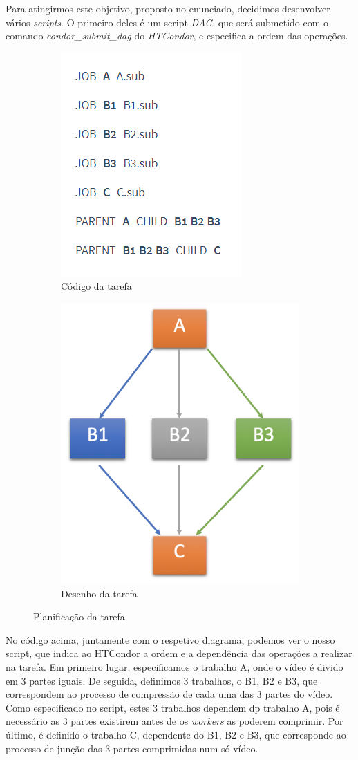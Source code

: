 \documentclass[a4paper]{report}
\begin{document}
    Para atingirmos este objetivo, proposto no enunciado, decidimos desenvolver vários \textit{scripts}. O primeiro deles é um script \textit{DAG}, que será submetido com o comando \textit{condor\_submit\_dag} do \textit{HTCondor}, e especifica a ordem das operações.

	\begin{figure}[h]
		\centering
		\begin{subfigure}{.5\textwidth}
			\centering
			\includegraphics[width=.4\linewidth]{DAG.png}
			\caption{Código da tarefa}
			\label{fig:sub1}
		\end{subfigure}%
		\begin{subfigure}{.5\textwidth}
			\centering
			\includegraphics[width=.4\linewidth]{Arquitetura-HTCondor.png}
			\caption{Desenho da tarefa}
			\label{fig:sub2}
		\end{subfigure}
		\caption{Planificação da tarefa}
		\label{fig:dag}
	\end{figure}

	No código acima, juntamente com o respetivo diagrama, podemos ver o nosso script, que indica ao HTCondor a ordem e a dependência das operações a realizar na tarefa. Em primeiro lugar, especificamos o trabalho A, onde o vídeo é divido em 3 partes iguais. De seguida, definimos 3 trabalhos, o B1, B2 e B3, que correspondem ao processo de compressão de cada uma das 3 partes do vídeo. Como especificado no script, estes 3 trabalhos dependem dp trabalho A, pois é necessário as 3 partes existirem antes de os \textit{workers} as poderem comprimir. Por último, é definido o trabalho C, dependente do B1, B2 e B3, que corresponde ao processo de junção das 3 partes comprimidas num só vídeo.
	
\end{document}
